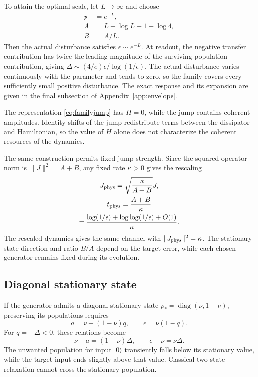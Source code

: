 \documentclass[aps,pra,reprint,amsmath,amssymb,nofootinbib,floatfix,longbibliography]{revtex4-2}
\theoremstyle{aps}
\DeclareMathOperator{\diag}{diag}
\newcommand{\eps}{\epsilon}
\newcommand{\ket}[1]{|#1\rangle}
\begin{document}
To attain the optimal scale, let $L\to\infty$ and choose
\begin{equation}\label{eq:familyparams}
 \begin{aligned}
 p&=e^{-L},\\
 A&=L+\log L+1-\log4,\\
 B&=A/L.
 \end{aligned}
\end{equation}
Then the actual disturbance satisfies $\eps\sim e^{-L}$. At readout, the negative transfer contribution has twice the leading magnitude of the surviving population contribution, giving $\Delta\sim(4/e)\eps/\log(1/\eps)$. The actual disturbance varies continuously with the parameter and tends to zero, so the family covers every sufficiently small positive disturbance. The exact response and its expansion are given in the final subsection of Appendix~\ref{app:envelope}.

The representation \eqref{eq:familyjump} has $H=0$, while the jump contains coherent amplitudes. Identity shifts of the jump redistribute terms between the dissipator and Hamiltonian, so the value of $H$ alone does not characterize the coherent resources of the dynamics.

The same construction permits fixed jump strength. Since the squared operator norm is $\|J\|^2=A+B$, any fixed rate $\kappa>0$ gives the rescaling
\begin{equation}\label{eq:fixed-strength}
 \begin{gathered}
 J_{\rm phys}=\sqrt{\frac{\kappa}{A+B}}J,\\
 t_{\rm phys}=\frac{A+B}{\kappa}
 \\=\frac{\log(1/\eps)+\log\log(1/\eps)+O(1)}{\kappa}.
 \end{gathered}
\end{equation}
The rescaled dynamics gives the same channel with $\|J_{\rm phys}\|^2=\kappa$. The stationary-state direction and ratio $B/A$ depend on the target error, while each chosen generator remains fixed during its evolution.

\subsection{Diagonal stationary state}

If the generator admits a diagonal stationary state $\rho_*=\diag(\nu,1-\nu)$, preserving its populations requires
\begin{equation}\label{eq:diagonal-exact}
 a=\nu+(1-\nu)q,\qquad \eps=\nu(1-q).
\end{equation}
For $q=-\Delta<0$, these relations become
\begin{equation}\label{eq:overshoot}
 \nu-a=(1-\nu)\Delta,\qquad \eps-\nu=\nu\Delta.
\end{equation}
The unwanted population for input $\ket0$ transiently falls below its stationary value, while the target input ends slightly above that value. Classical two-state relaxation cannot cross the stationary population.
\end{document}
